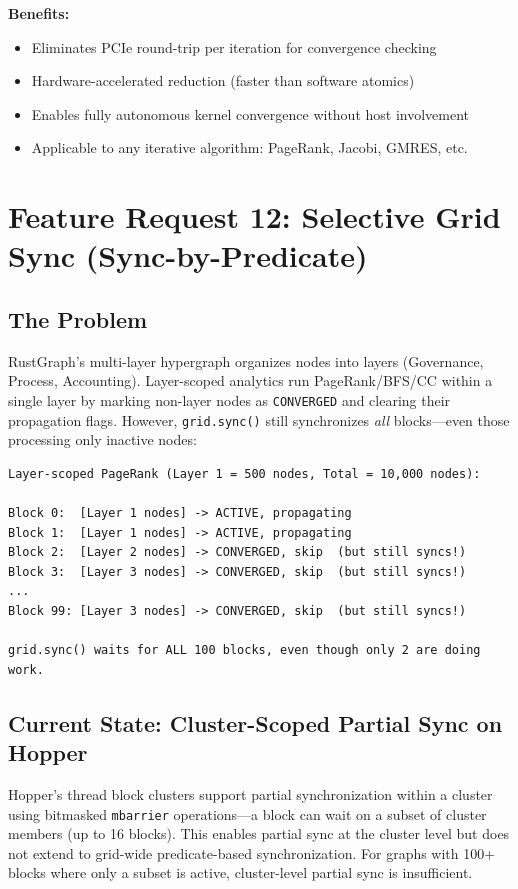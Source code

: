 \documentclass[11pt,a4paper]{article}
\newenvironment{benefitsbox}{%
    \vspace{6pt}%
    \noindent\textbf{Benefits:}%
    \begin{itemize}[leftmargin=1.5em,topsep=2pt,itemsep=1pt]%
}{%
    \end{itemize}%
    \vspace{6pt}%
}
\begin{document}
\begin{benefitsbox}
    \item Eliminates PCIe round-trip per iteration for convergence checking
    \item Hardware-accelerated reduction (faster than software atomics)
    \item Enables fully autonomous kernel convergence without host involvement
    \item Applicable to any iterative algorithm: PageRank, Jacobi, GMRES, etc.
\end{benefitsbox}

\newpage

\section{Feature Request 12: Selective Grid Sync (Sync-by-Predicate)}

\subsection{The Problem}

RustGraph's multi-layer hypergraph organizes nodes into layers (Governance, Process, Accounting). Layer-scoped analytics run PageRank/BFS/CC within a single layer by marking non-layer nodes as \texttt{CONVERGED} and clearing their propagation flags. However, \texttt{grid.sync()} still synchronizes \textit{all} blocks---even those processing only inactive nodes:

\begin{Verbatim}[fontsize=\small,frame=single,framesep=3mm]
Layer-scoped PageRank (Layer 1 = 500 nodes, Total = 10,000 nodes):

Block 0:  [Layer 1 nodes] -> ACTIVE, propagating
Block 1:  [Layer 1 nodes] -> ACTIVE, propagating
Block 2:  [Layer 2 nodes] -> CONVERGED, skip  (but still syncs!)
Block 3:  [Layer 3 nodes] -> CONVERGED, skip  (but still syncs!)
...
Block 99: [Layer 3 nodes] -> CONVERGED, skip  (but still syncs!)

grid.sync() waits for ALL 100 blocks, even though only 2 are doing work.
\end{Verbatim}

\subsection{Current State: Cluster-Scoped Partial Sync on Hopper}

Hopper's thread block clusters support partial synchronization within a cluster using bitmasked \texttt{mbarrier} operations---a block can wait on a subset of cluster members (up to 16 blocks). This enables partial sync at the cluster level but does not extend to grid-wide predicate-based synchronization. For graphs with 100+ blocks where only a subset is active, cluster-level partial sync is insufficient.
\end{document}
